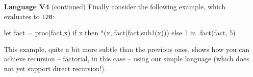 \begin{minipage}[t]{\sw}
\slidenumber
\LARGE
{\bf Language V4} (continued)\exx
Finally consider the following example,
which evaluates to \verb'120':
\Large
\begin{qv}
let
  fact = proc(fact,x)
    if x
    then *(x,.fact(fact,sub1(x)))
    else 1
in
  .fact(fact, 5)
\end{qv}
\LARGE
This example,
quite a bit more subtle than the previous ones,
shows how you can achieve recursion --
factorial, in this case --
using our simple language (which does not yet support direct recursion!).
\end{minipage}
